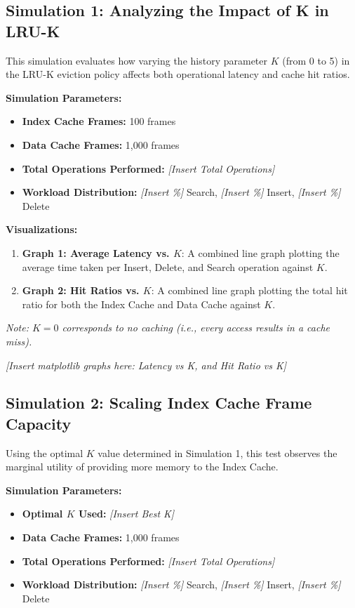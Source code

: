 \documentclass[12pt, a4paper]{article}
\begin{document}
\subsection{Simulation 1: Analyzing the Impact of K in LRU-K}
This simulation evaluates how varying the history parameter $K$ (from 0 to 5) in the LRU-K eviction policy affects both operational latency and cache hit ratios. 

\textbf{Simulation Parameters:}
\begin{itemize}
    \item \textbf{Index Cache Frames:} 100 frames
    \item \textbf{Data Cache Frames:} 1,000 frames
    \item \textbf{Total Operations Performed:} \textit{[Insert Total Operations]}
    \item \textbf{Workload Distribution:} \textit{[Insert \%]} Search, \textit{[Insert \%]} Insert, \textit{[Insert \%]} Delete
\end{itemize}

\textbf{Visualizations:}
\begin{enumerate}
    \item \textbf{Graph 1: Average Latency vs. $K$}: A combined line graph plotting the average time taken per Insert, Delete, and Search operation against $K$.
\item \textbf{Graph 2: Hit Ratios vs. $K$}: A combined line graph plotting the total hit ratio for both the Index Cache and Data Cache against $K$.
\end{enumerate}

\vspace{0.5em}
\noindent\textit{Note: $K = 0$ corresponds to no caching (i.e., every access results in a cache miss).}

\textit{[Insert matplotlib graphs here: Latency vs K, and Hit Ratio vs K]}

\subsection{Simulation 2: Scaling Index Cache Frame Capacity}
Using the optimal $K$ value determined in Simulation 1, this test observes the marginal utility of providing more memory to the Index Cache.

\textbf{Simulation Parameters:}
\begin{itemize}
    \item \textbf{Optimal $K$ Used:} \textit{[Insert Best K]}
    \item \textbf{Data Cache Frames:} 1,000 frames
    \item \textbf{Total Operations Performed:} \textit{[Insert Total Operations]}
    \item \textbf{Workload Distribution:} \textit{[Insert \%]} Search, \textit{[Insert \%]} Insert, \textit{[Insert \%]} Delete
\end{itemize}
\end{document}
